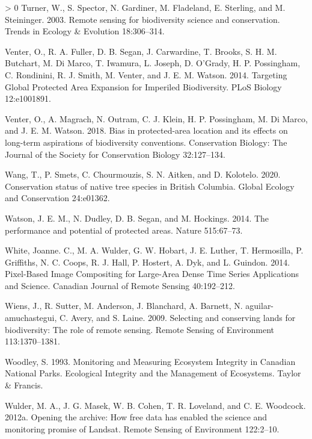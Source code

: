 \documentclass[11pt]{article}
\newlength{\cslhangindent}
\newenvironment{CSLReferences}[3] %
 {%
  \setlength{\parindent}{0pt}
  \ifodd #1 \everypar{\setlength{\hangindent}{\cslhangindent}}\ignorespaces\fi
  \ifnum #2 > 0
  \setlength{\parskip}{#2\baselineskip}
  \fi
 }%
 {}
\begin{document}
\begin{CSLReferences}{1}{0}
\leavevmode\hypertarget{ref-turner2003}{}%
Turner, W., S. Spector, N. Gardiner, M. Fladeland, E. Sterling, and M.
Steininger. 2003. Remote sensing for biodiversity science and
conservation. Trends in Ecology \& Evolution 18:306--314.

\leavevmode\hypertarget{ref-venter2014}{}%
Venter, O., R. A. Fuller, D. B. Segan, J. Carwardine, T. Brooks, S. H.
M. Butchart, M. Di Marco, T. Iwamura, L. Joseph, D. O'Grady, H. P.
Possingham, C. Rondinini, R. J. Smith, M. Venter, and J. E. M. Watson.
2014. Targeting Global Protected Area Expansion for Imperiled
Biodiversity. PLoS Biology 12:e1001891.

\leavevmode\hypertarget{ref-venter2018}{}%
Venter, O., A. Magrach, N. Outram, C. J. Klein, H. P. Possingham, M. Di
Marco, and J. E. M. Watson. 2018. Bias in protected-area location and
its effects on long-term aspirations of biodiversity conventions.
Conservation Biology: The Journal of the Society for Conservation
Biology 32:127--134.

\leavevmode\hypertarget{ref-wang2020}{}%
Wang, T., P. Smets, C. Chourmouzis, S. N. Aitken, and D. Kolotelo. 2020.
Conservation status of native tree species in British Columbia. Global
Ecology and Conservation 24:e01362.

\leavevmode\hypertarget{ref-watsonPerformancePotentialProtected2014}{}%
Watson, J. E. M., N. Dudley, D. B. Segan, and M. Hockings. 2014. The
performance and potential of protected areas. Nature 515:67--73.

\leavevmode\hypertarget{ref-whitePixelBasedImageCompositing2014}{}%
White, Joanne. C., M. A. Wulder, G. W. Hobart, J. E. Luther, T.
Hermosilla, P. Griffiths, N. C. Coops, R. J. Hall, P. Hostert, A. Dyk,
and L. Guindon. 2014. Pixel-Based Image Compositing for Large-Area Dense
Time Series Applications and Science. Canadian Journal of Remote Sensing
40:192--212.

\leavevmode\hypertarget{ref-wiens2009}{}%
Wiens, J., R. Sutter, M. Anderson, J. Blanchard, A. Barnett, N.
aguilar-amuchastegui, C. Avery, and S. Laine. 2009. Selecting and
conserving lands for biodiversity: The role of remote sensing. Remote
Sensing of Environment 113:1370--1381.

\leavevmode\hypertarget{ref-woodleyMonitoringMeasuringEcosystem1993}{}%
Woodley, S. 1993. Monitoring and Measuring Ecosystem Integrity in
Canadian National Parks. Ecological Integrity and the Management of
Ecosystems. Taylor \& Francis.

\leavevmode\hypertarget{ref-wulderOpeningArchiveHow2012}{}%
Wulder, M. A., J. G. Masek, W. B. Cohen, T. R. Loveland, and C. E.
Woodcock. 2012a. Opening the archive: How free data has enabled the
science and monitoring promise of Landsat. Remote Sensing of Environment
122:2--10.


\end{CSLReferences}
\end{document}
